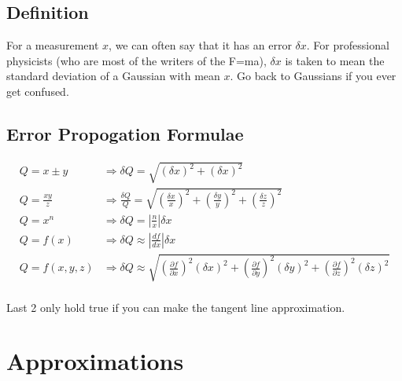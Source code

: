 \documentclass[12pt]{article}
\begin{document}
\subsection{Definition}
For a measurement $x$, we can often say that it has an error $\delta x$.
For professional physicists (who are most of the writers of the F=ma), $\delta x$ is taken to mean the standard deviation of a Gaussian with mean $x$.
Go back to Gaussians if you ever get confused.

\subsection{Error Propogation Formulae}

\begin{align*}
    Q = x \pm y & \Rightarrow \delta Q = \sqrt{\left (\delta x \right ) ^2 + \left (\delta x \right ) ^2} \\
    Q = \frac{xy}{z} & \Rightarrow \frac{\delta Q}{Q} = \sqrt{\left ( \frac{\delta x}{x} \right)^2 + \left ( \frac{\delta y}{y} \right)^2 + \left ( \frac{\delta z}{z} \right)^2} \\
    Q = x^n & \Rightarrow \delta Q = \left | \frac{n}{x} \right| \delta x \\
    Q = f(x) & \Rightarrow \delta Q \approx  \left | \frac{df}{dx} \right | \delta x\\
    Q = f(x, y, z) & \Rightarrow \delta Q \approx \sqrt{\left ( \frac{\partial f}{\partial x} \right)^2 \left ( \delta x \right)^2 +  \left( \frac{\partial f}{\partial y} \right)^2 \left ( \delta y \right )^2 + \left( \frac{\partial f}{\partial z} \right)^2 \left ( \delta z \right )^2 }\\
\end{align*}

Last 2 only hold true if you can make the tangent line approximation.

\section{Approximations}
\end{document}
